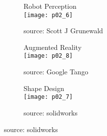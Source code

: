 \begin{figure}
    \captionsetup[subfigure]{labelformat=empty}
    \begin{subfigure}{0.3\textwidth}
        Robot Perception \\
        \texttt{[image: p02\_6]}
        \caption{source: Scott J Grunewald}
    \end{subfigure}
    \hspace{5mm}
    \begin{subfigure}{0.3\textwidth}
        Augmented Reality \\
        \texttt{[image: p02\_8]}
        \caption{source: Google Tango}
    \end{subfigure}
    \hspace{2mm}
    \begin{subfigure}{0.3\textwidth}
        Shape Design \\
        \texttt{[image: p02\_7]}
        \caption{source: solidworks}
    \end{subfigure}
\end{figure}
